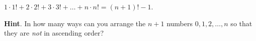 \documentclass{book}
\begin{document}
\setcounter{cpjt}{105}
\addtocounter{cpjt}{-1}
\begin{activity}\label{activity-98}
\hypertarget{p-724}{}%
\(1 \cdot 1! + 2 \cdot 2! + 3 \cdot 3! + \ldots + n \cdot n! = \left( n + 1 \right)! - 1\).%
\par\smallskip%
\noindent\textbf{Hint}.\hypertarget{hint-59}{}\quad%
\hypertarget{p-725}{}%
In how many ways can you arrange the \(n+1\) numbers \(0, 1, 2, \ldots, n\) so that they are \emph{not} in ascending order?%
\par\smallskip%
\noindent\end{activity}

\clearpage
\end{document}
